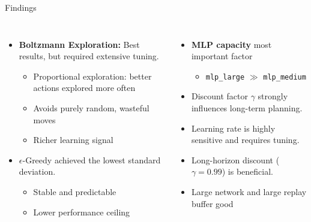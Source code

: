\documentclass[aspectratio=169]{beamer}
\begin{document}
\begin{frame}{Findings}
  \begin{columns}[T]

    \begin{itemize}

      \item \textbf{Boltzmann Exploration:} Best results, but required extensive tuning.
      \begin{itemize}
        \item Proportional exploration: better actions explored more often
        \item Avoids purely random, wasteful moves
        \item Richer learning signal
      \end{itemize}
      \item $\epsilon$-Greedy achieved the lowest standard deviation.
      \begin{itemize}
        \item Stable and predictable
        \item Lower performance ceiling
      \end{itemize}
    \end{itemize}

    \begin{itemize}

      \item \textbf{MLP capacity} most important factor
      \begin{itemize}
        \item \texttt{mlp\_large} $\gg$ \texttt{mlp\_medium}
      \end{itemize}
      \item Discount factor $\gamma$ strongly influences long-term planning.
      \item Learning rate is highly sensitive and requires tuning.
      \item Long-horizon discount ($\gamma=0.99$) is beneficial.
      \item Large network and large replay buffer good

    \end{itemize}

  \end{columns}
\end{frame}
\end{document}
